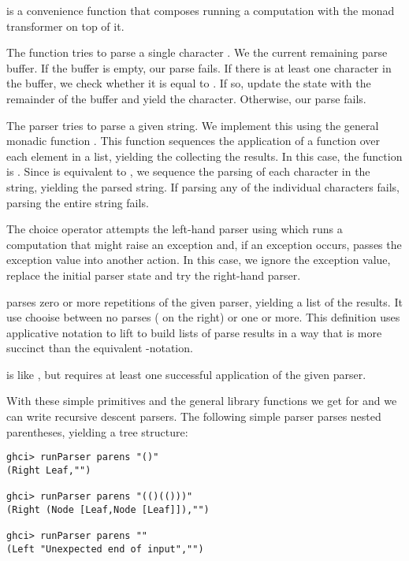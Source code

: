\begin{notelist}
    \item {} is a convenience function that composes running a  computation with 
          the  monad transformer on top of it. 
    \item The function  tries to parse a single character . We  the current remaining
          parse buffer. If the buffer is empty, our parse fails. If there is at least one character in the buffer, we check 
          whether it is equal to . If so, update the state with the remainder of the buffer and yield the character.
          Otherwise, our parse fails.
    \item The  parser tries to parse a given string. We implement this using the general monadic function
          . This function sequences the application of a function
          over each element in a list, yielding the collecting the results. In this case, the function is 
          . Since  is equivalent to \code{[Char]}, we sequence
          the parsing of each character in the string, yielding the parsed string. If parsing any of the individual
          characters fails, parsing the entire string fails.
    \item The choice operator  attempts the left-hand parser using  which
          runs a computation that might raise an exception and, if an exception occurs, passes the exception value into another action.
          In this case, we ignore the exception value, replace the initial parser state and try the right-hand parser.
    \item {} parses zero or more repetitions of the given parser, yielding a list of the results. It use \code{(<|>)} chooise
          between no parses ( on the right) or one or more. This definition uses applicative notation to
          lift \code{(:)} to build lists of parse results in a way that is more succinct than the equivalent -notation.
    \item {} is like , but requires at least one successful application of the given parser.
\end{notelist}

With these simple primitives and the general library functions we get for  and  we can
write recursive descent parsers. The following simple parser parses nested parentheses, yielding a tree structure:



\begin{lstlisting}
ghci> runParser parens "()"
(Right Leaf,"")

ghci> runParser parens "(()(()))"
(Right (Node [Leaf,Node [Leaf]]),"")

ghci> runParser parens ""
(Left "Unexpected end of input","")
\end{lstlisting}

